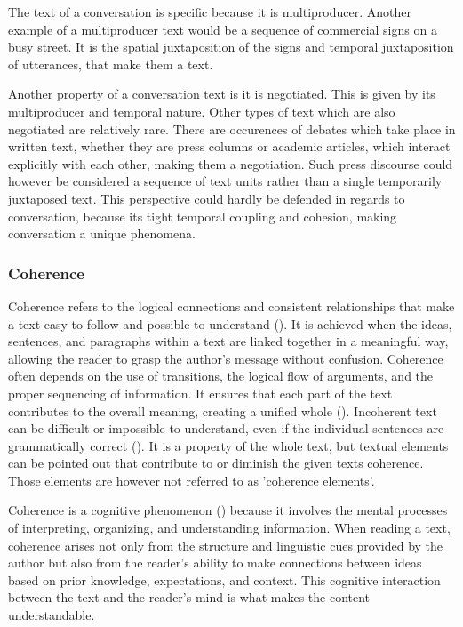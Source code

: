 \documentclass[12pt]{report}
\begin{document}
{\par
    The text of a conversation is specific because it is multiproducer.
    Another example of a multiproducer text
    would be a sequence of commercial signs on a busy street.
    It is the spatial juxtaposition of the signs and temporal juxtaposition of utterances,
    that make them a text.

    \par
    Another property of a conversation text is it is negotiated.
    This is given by its multiproducer and temporal nature.
    Other types of text which are also negotiated are relatively rare.
    There are occurences of debates which take place in written text,
    whether they are press columns or academic articles, which
    interact explicitly with each other, making them a negotiation.
    Such press discourse could however be considered
    a sequence of text units rather than a single temporarily juxtaposed text.
    This perspective could hardly be defended in regards to conversation, because
    its tight temporal coupling and cohesion,
    making conversation a unique phenomena.

\subsubsection{Coherence}
\par
    Coherence refers to the logical connections and consistent relationships that
    make a text easy to follow and possible to understand ().
    It is achieved when the ideas, sentences, and paragraphs within a text are linked together in a meaningful way,
    allowing the reader to grasp the author's message without confusion.
    Coherence often depends on the use of transitions, the logical flow of arguments, and the proper sequencing of information.
    It ensures that each part of the text contributes to the overall meaning, creating a unified whole ().
    Incoherent text can be difficult or impossible to understand, even if the individual sentences are grammatically correct ().
    It is a property of the whole text, but
    textual elements can be pointed out that contribute to or diminish the given texts coherence.
    Those elements are however not referred to as 'coherence elements'.

\par
    Coherence is a cognitive phenomenon () because
    it involves the mental processes of interpreting, organizing, and understanding information.
    When reading a text,
    coherence arises not only from the structure and linguistic cues provided by the author but
    also from the reader's ability to
    make connections between ideas based on prior knowledge, expectations, and context.
    This cognitive interaction between the text and the reader’s mind is what makes the content understandable.

}
\end{document}
